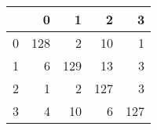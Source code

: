 \begin{tabular}{lrrrr}
\toprule
{} &    0 &    1 &    2 &    3 \\
\midrule
0 &  128 &    2 &   10 &    1 \\
1 &    6 &  129 &   13 &    3 \\
2 &    1 &    2 &  127 &    3 \\
3 &    4 &   10 &    6 &  127 \\
\bottomrule
\end{tabular}
